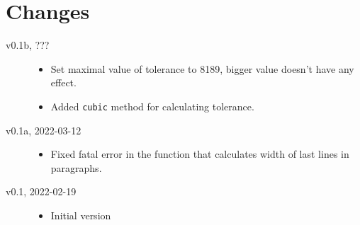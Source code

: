 \documentclass{l3doc}
\begin{document}
\section{Changes}

\begin{description}
  \item[v0.1b, ???]\hfill
    \begin{itemize}
      \item Set maximal value of tolerance to 8189, bigger value doesn't have any effect.
      \item Added \verb|cubic| method for calculating tolerance.
    \end{itemize}
  \item[v0.1a, 2022-03-12]\hfill

    \begin{itemize}
      \item Fixed fatal error in the function that calculates width of last lines in paragraphs.
    \end{itemize}

  \item[v0.1, 2022-02-19]\hfill

    \begin{itemize}
      \item Initial version
    \end{itemize}
\end{description}
\end{document}
